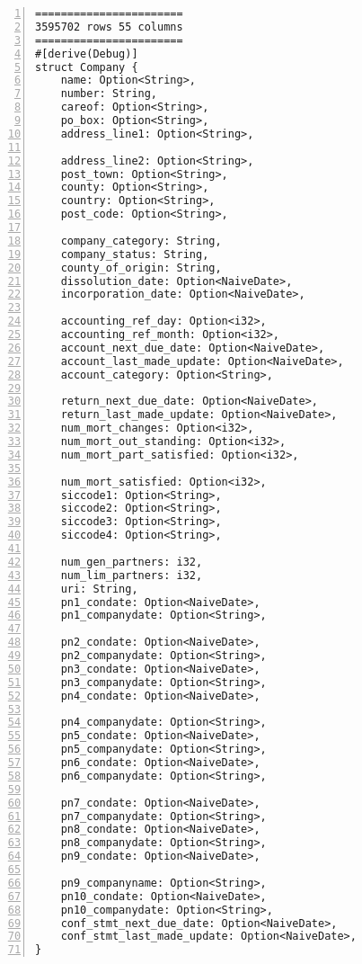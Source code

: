 \lstset{basicstyle=\ttfamily\tiny}  
\begin{lstlisting}[breaklines, frame=single, numbers=left, caption={Source code for Company struct. (company.rs)}, label=commandline-02]
=======================
3595702 rows 55 columns 
=======================
#[derive(Debug)]
struct Company {
	name: Option<String>,
	number: String,
	careof: Option<String>,
	po_box: Option<String>,
	address_line1: Option<String>,
	
	address_line2: Option<String>,
	post_town: Option<String>,
	county: Option<String>,
	country: Option<String>,
	post_code: Option<String>,
	
	company_category: String,
	company_status: String,
	county_of_origin: String,
	dissolution_date: Option<NaiveDate>,
	incorporation_date: Option<NaiveDate>,
	
	accounting_ref_day: Option<i32>,
	accounting_ref_month: Option<i32>,
	account_next_due_date: Option<NaiveDate>,
	account_last_made_update: Option<NaiveDate>,
	account_category: Option<String>,
	
	return_next_due_date: Option<NaiveDate>,
	return_last_made_update: Option<NaiveDate>,
	num_mort_changes: Option<i32>,
	num_mort_out_standing: Option<i32>,
	num_mort_part_satisfied: Option<i32>,
	
	num_mort_satisfied: Option<i32>,
	siccode1: Option<String>,
	siccode2: Option<String>,
	siccode3: Option<String>,
	siccode4: Option<String>,
	
	num_gen_partners: i32,
	num_lim_partners: i32,
	uri: String,
	pn1_condate: Option<NaiveDate>,
	pn1_companydate: Option<String>,
	
	pn2_condate: Option<NaiveDate>,
	pn2_companydate: Option<String>,
	pn3_condate: Option<NaiveDate>,
	pn3_companydate: Option<String>,
	pn4_condate: Option<NaiveDate>,
	
	pn4_companydate: Option<String>,
	pn5_condate: Option<NaiveDate>,
	pn5_companydate: Option<String>,
	pn6_condate: Option<NaiveDate>,
	pn6_companydate: Option<String>,
	
	pn7_condate: Option<NaiveDate>,
	pn7_companydate: Option<String>,
	pn8_condate: Option<NaiveDate>,
	pn8_companydate: Option<String>,
	pn9_condate: Option<NaiveDate>,
	
	pn9_companyname: Option<String>,
	pn10_condate: Option<NaiveDate>,
	pn10_companydate: Option<String>,
	conf_stmt_next_due_date: Option<NaiveDate>,
	conf_stmt_last_made_update: Option<NaiveDate>,
}

\end{lstlisting}

